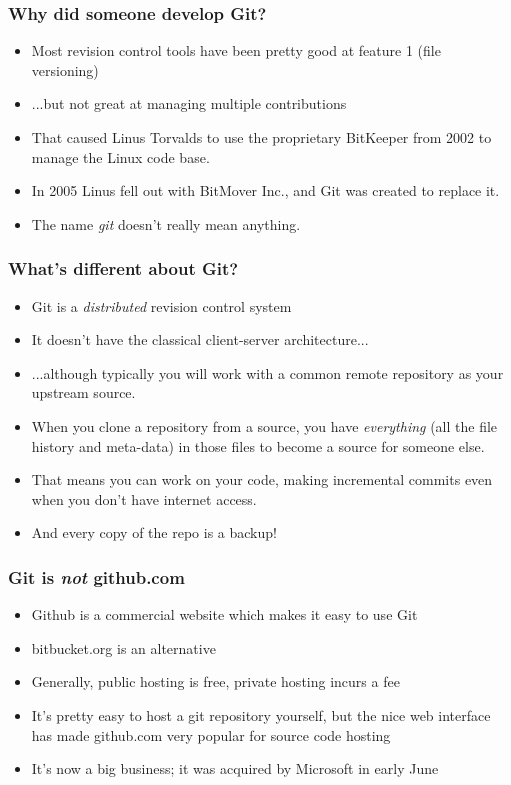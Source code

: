 \documentclass{beamer}
\begin{document}
\begin{frame}
  \frametitle{Why did someone develop Git?}
  \begin{itemize}
    \pause \item Most revision control tools have been pretty good at
    feature 1 (file versioning)
    \pause \item ...but not great at managing multiple contributions
    \pause \item That caused Linus Torvalds to use the proprietary
    BitKeeper from 2002 to manage the Linux code base.
    \pause \item In 2005 Linus fell out with BitMover Inc., and Git was
    created to replace it.
    \pause \item The name \emph{git} doesn't really mean anything.
  \end{itemize}
\end{frame}

\begin{frame}
  \frametitle{What's different about Git?}
  \begin{itemize}
  \item Git is a \emph{distributed} revision control system
  \pause \item It doesn't have the classical client-server architecture...
  \pause \item ...although typically you will work with a common
  \alert{remote} repository as your \alert{upstream} source.
  \pause \item When you \alert{clone} a repository from a source, you have
    \emph{everything} (all the file history and meta-data) in those
    files to become a source for someone else.
  \pause \item That means you can work on your code, making incremental
  \alert{commits} even when you don't have internet access.
  \pause \item And every copy of the repo is a backup!
  \end{itemize}
\end{frame}

\begin{frame}
  \frametitle{Git is \emph{not} github.com}
  \begin{itemize}
  \item Github is a commercial website which makes it easy to use Git
  \item bitbucket.org is an alternative
  \pause \item Generally, public hosting is free, private hosting
  incurs a fee
  \pause \item It's pretty easy to host a git repository yourself, but
  the nice web interface has made github.com very
  popular for source code hosting
  \pause \item It's now a big business; it was acquired by Microsoft in early June
  \end{itemize}
\end{frame}
\end{document}
